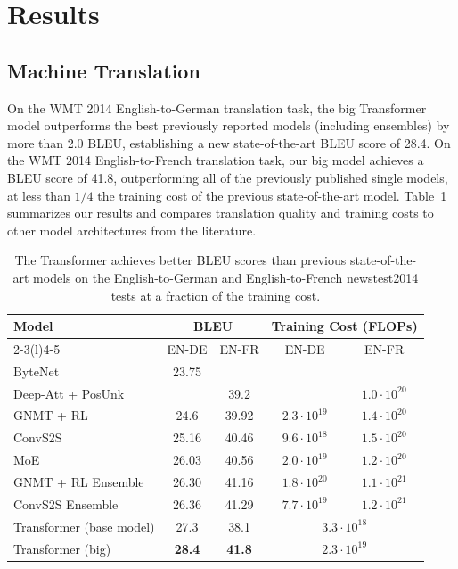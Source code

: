 \documentclass[10pt,letterpaper]{article}
\begin{document}
\section{Results}
\subsection{Machine Translation}
On the WMT 2014 English-to-German translation task, the big Transformer model
outperforms the best previously reported models (including ensembles) by more than
2.0 BLEU, establishing a new state-of-the-art BLEU score of 28.4. On the WMT 2014
English-to-French translation task, our big model achieves a BLEU score of 41.8,
outperforming all of the previously published single models, at less than $1/4$ the
training cost of the previous state-of-the-art model. Table~\ref{tab:results}
summarizes our results and compares translation quality and training costs to other
model architectures from the literature.

\begin{table}[t]
\centering
\caption{The Transformer achieves better BLEU scores than previous
state-of-the-art models on the English-to-German and English-to-French
newstest2014 tests at a fraction of the training cost.}
\label{tab:results}
\begin{tabular}{@{}lcccc@{}}
\toprule
\multirow{2}{*}{Model} & \multicolumn{2}{c}{BLEU} & \multicolumn{2}{c}{Training Cost (FLOPs)} \\
\cmidrule(lr){2-3}\cmidrule(l){4-5}
 & EN-DE & EN-FR & EN-DE & EN-FR \\
\midrule
ByteNet \citep{kalchbrenner2016neural}            & 23.75 &       &                   &  \\
Deep-Att + PosUnk \citep{zhou2016deep}            &       & 39.2  &                   & $1.0\cdot10^{20}$ \\
GNMT + RL \citep{wu2016google}                    & 24.6  & 39.92 & $2.3\cdot10^{19}$ & $1.4\cdot10^{20}$ \\
ConvS2S \citep{gehring2017convolutional}          & 25.16 & 40.46 & $9.6\cdot10^{18}$ & $1.5\cdot10^{20}$ \\
MoE \citep{shazeer2017outrageously}               & 26.03 & 40.56 & $2.0\cdot10^{19}$ & $1.2\cdot10^{20}$ \\
\midrule
GNMT + RL Ensemble \citep{wu2016google}           & 26.30 & 41.16 & $1.8\cdot10^{20}$ & $1.1\cdot10^{21}$ \\
ConvS2S Ensemble \citep{gehring2017convolutional} & 26.36 & 41.29 & $7.7\cdot10^{19}$ & $1.2\cdot10^{21}$ \\
\midrule
Transformer (base model) & 27.3 & 38.1 & \multicolumn{2}{c}{$3.3\cdot10^{18}$} \\
Transformer (big)        & \textbf{28.4} & \textbf{41.8} & \multicolumn{2}{c}{$2.3\cdot10^{19}$} \\
\bottomrule
\end{tabular}
\end{table}
\end{document}
